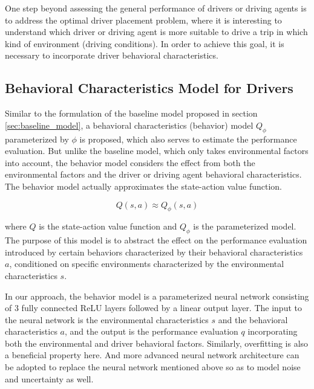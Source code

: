\documentclass{article}
\begin{document}

One step beyond assessing the general performance of drivers or driving agents is to address the optimal driver placement problem, where it is interesting to understand which driver or driving agent is more suitable to drive a trip in which kind of environment (driving conditions). In order to achieve this goal, it is necessary to incorporate driver behavioral characteristics.


\subsection{Behavioral Characteristics Model for Drivers}\label{sec:behavior_model}

Similar to the formulation of the baseline model proposed in section \ref{sec:baseline_model}, a behavioral characteristics (behavior) model $ Q_{\phi} $ parameterized by $ \phi $ is proposed, which also serves to estimate the performance evaluation. But unlike the baseline model, which only takes environmental factors into account, the behavior model considers the effect from both the environmental factors and the driver or driving agent behavioral characteristics. The behavior model actually approximates the state-action value function.

\[
Q(s, a) \approx Q_{\phi}(s, a)
\]

where $ Q $ is the state-action value function and $ Q_{\phi} $ is the parameterized model. The purpose of this model is to abstract the effect on the performance evaluation introduced by certain behaviors characterized by their behavioral characteristics $ a $, conditioned on specific environments characterized by the environmental characteristics $ s $.

In our approach, the behavior model is a parameterized neural network consisting of $ 3 $ fully connected ReLU layers followed by a linear output layer. The input to the neural network is the environmental characteristics $ s $ and the behavioral characteristics $ a $, and the output is the performance evaluation $ q $ incorporating both the environmental and driver behavioral factors. Similarly, overfitting is also a beneficial property here. And more advanced neural network architecture \cite{yamaguchi2016neural} can be adopted to replace the neural network mentioned above so as to model noise and uncertainty as well.
\end{document}
